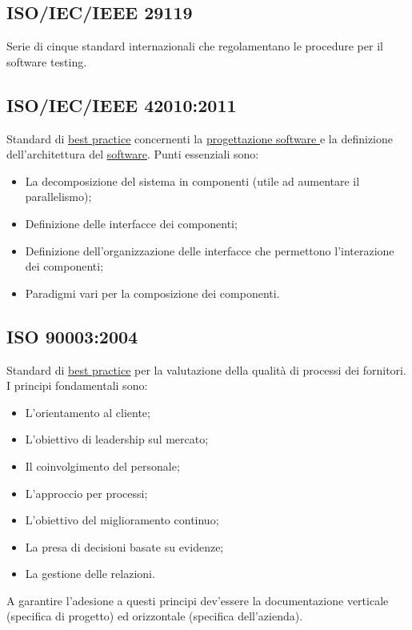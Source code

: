 	\subsection{ISO/IEC/IEEE 29119}
	\label{sec:iso29119}
	Serie di cinque standard internazionali che regolamentano le procedure per il software testing.
	
	\subsection{ISO/IEC/IEEE 42010:2011}
	\label{sec:iso12207}
	Standard di \underline{\hyperref[sec:bestpractice]{best practice}} concernenti la \underline{\hyperref[sec:progettazionesoftware]{progettazione software }} e la definizione dell'architettura del \underline{\hyperref[sec:prodottosoftware]{software}}. Punti essenziali sono:
	\begin{itemize}
	\item La decomposizione del sistema in componenti (utile ad aumentare il parallelismo);
	\item Definizione delle interfacce dei componenti;
	\item Definizione dell'organizzazione delle interfacce che permettono l'interazione dei componenti;
	\item Paradigmi vari per la composizione dei componenti.
	\end{itemize}


	\subsection{ISO 90003:2004}
	\label{sec:iso90003}
	Standard di \underline{\hyperref[sec:bestpractice]{best practice}} per la valutazione della qualità di processi dei fornitori. I principi fondamentali sono:
	\begin{itemize}
	\item L'orientamento al cliente;
	\item L'obiettivo di leadership sul mercato;
	\item Il coinvolgimento del personale;
	\item L'approccio per processi;
	\item L'obiettivo del miglioramento continuo;
	\item La presa di decisioni basate su evidenze;
	\item La gestione delle relazioni.
	\end{itemize}
	A garantire l'adesione a questi principi dev'essere la documentazione verticale (specifica di progetto) ed orizzontale (specifica dell'azienda).


